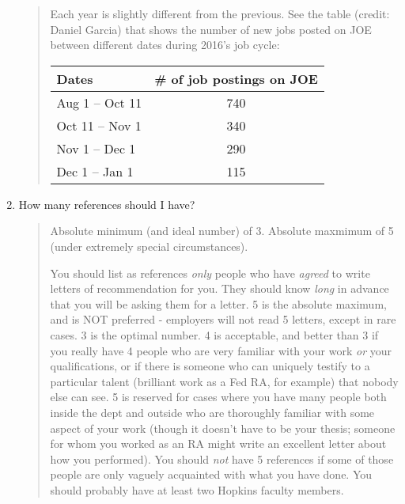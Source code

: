 \documentclass{\classes/econtex}
\providecommand\phantomsection{}
\begin{document}
\begin{enumerate}
      \begin{quote}
        Each year is slightly different from the previous. See the table (credit: Daniel Garcia) 
        that shows the number of new jobs posted on JOE between different dates 
        during 2016's job cycle:
        \ifdvi\phantomsection\hypertarget{JobPostDates}{}\fi
        \begin{table}[h]
          \centering
          \begin{tabular}{|l|c|}
            \hline
            Dates                   & \# of job postings on JOE \\ \hline
            Aug 1 -- Oct 11   & 740                       \\ \hline
            Oct 11 -- Nov 1 & 340                       \\ \hline
            Nov 1 -- Dec 1 & 290                       \\ \hline
            Dec 1 -- Jan 1  & 115                       \\ \hline
          \end{tabular}
        \end{table}
      \end{quote}

  \item How many references should I have?

    \begin{quote}
      Absolute minimum (and ideal number) of 3.  Absolute maxmimum of 5 (under
      extremely special circumstances).  

      You should list as references \textit{only} people who have \textit{agreed}
      to write letters of recommendation for you.  They should know \textit{long} in advance that you will be asking them for a letter.  5 is the absolute
      maximum, and is NOT preferred - employers will not read 5 letters,
      except in rare cases.  3 is the optimal number.  4 is acceptable, and
      better than 3 if you really have 4 people who are very familiar with
      your work \textit{or} your qualifications, or if there is someone who can
      uniquely testify to a particular talent (brilliant work as a Fed RA,
      for example) that nobody else can see.  5 is reserved for cases where
      you have many people both inside the dept and outside who are
      thoroughly familiar with some aspect of your work (though it doesn't
      have to be your thesis; someone for whom you worked as an RA might
      write an excellent letter about how you performed).  You should \textit{not} have 5 references if some of those people are only vaguely
      acquainted with what you have done.  You should probably have at least
      two Hopkins faculty members.


\end{quote}
\end{enumerate}
\end{document}
